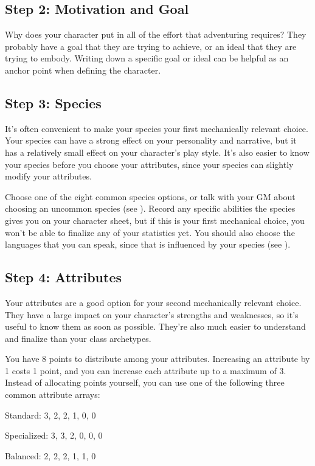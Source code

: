   \subsection{Step 2: Motivation and Goal}
    Why does your character put in all of the effort that adventuring requires?
    They probably have a goal that they are trying to achieve, or an ideal that they are trying to embody.
    Writing down a specific goal or ideal can be helpful as an anchor point when defining the character.

  \subsection{Step 3: Species}
    It's often convenient to make your species your first mechanically relevant choice.
    Your species can have a strong effect on your personality and narrative, but it has a relatively small effect on your character's play style.
    It's also easier to know your species before you choose your attributes, since your species can slightly modify your attributes.

    Choose one of the eight common species options, or talk with your GM about choosing an uncommon species (see ).
    Record any specific abilities the species gives you on your character sheet, but if this is your first mechanical choice, you won't be able to finalize any of your statistics yet.
    You should also choose the languages that you can speak, since that is influenced by your species (see ).

  \subsection{Step 4: Attributes}\label{Step 4: Attributes}
    Your attributes are a good option for your second mechanically relevant choice.
    They have a large impact on your character's strengths and weaknesses, so it's useful to know them as soon as possible.
    They're also much easier to understand and finalize than your class archetypes.

    You have 8 points to distribute among your attributes.
    Increasing an attribute by 1 costs 1 point, and you can increase each attribute up to a maximum of 3.
    Instead of allocating points yourself, you can use one of the following three common attribute arrays:
    \begin{raggeditemize}
      \item Standard: 3, 2, 2, 1, 0, 0
      \item Specialized: 3, 3, 2, 0, 0, 0
      \item Balanced: 2, 2, 2, 1, 1, 0
    \end{raggeditemize}


